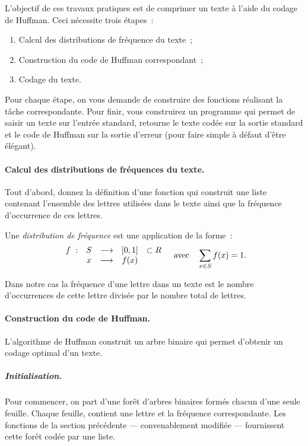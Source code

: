 \begin{exercice}
  L'objectif de ces travaux pratiques est de comprimer un texte \`a
  l'aide du codage de Huffman. Ceci n\'ecessite trois \'etapes~:
  \begin{enumerate}
  \item Calcul des distributions de fr\'equence du texte~;
  \item Construction du code de Huffman correspondant~;
  \item Codage du texte.
  \end{enumerate}
  Pour chaque \'etape, on vous demande de construire des fonctions
  r\'ealisant la t\^ache correspondante. Pour finir, vous construirez
  un programme qui permet de saisir un texte sur l'entr\'ee standard,
  retourne le texte cod\'ee sur la sortie standard et le code de
  Huffman sur la sortie d'erreur (pour faire simple \`a d\'efaut
  d'\^etre \'el\'egant).

  \paragraph{Calcul des distributions de fr\'equences du texte.}
  Tout d'abord, donnez la d\'efinition d'une fonction qui construit
  une liste contenant l'ensemble des lettres utilis\'ees dans le texte
  ainsi que la fr\'equence d'occurrence de ces lettres.
  \par
  Une \emph{distribution de fr\'equence} est une application de la
  forme~:
  $$
  \begin{array}{ccccc}
  f\ :& S& \longrightarrow& [0,1]& \subset R \\
       & x& \longrightarrow& f(x) 
  \end{array} \quad
  \textup{avec}\quad \sum_{x \in S} f(x)=1.
  $$
\par
  Dans notre cas la fr\'equence d'une lettre dans un texte est le
  nombre d'occurrences de cette lettre divis\'ee par le nombre total
  de lettres.
  \paragraph{Construction du code de Huffman.}
  L'algorithme de Huffman construit un arbre binaire qui permet
  d'obtenir un codage optimal d'un texte.
  \subparagraph{Initialisation.}  Pour commencer, on part d'une
  for\^et d'arbres binaires form\'es chacun d'une seule feuille.
  Chaque feuille, contient une lettre et la fr\'equence
  correspondante. Les fonctions de la section pr\'ec\'edente ---
  convenablement modifi\'ee --- fournissent cette for\^et cod\'ee par
  une liste.
  

\end{exercice}
